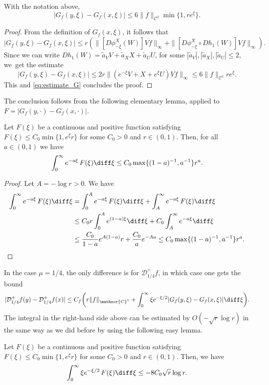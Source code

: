 \begin{lemma}
With the notation above,
\[
|G_{f}(y,\xi) -G_{f}(x,\xi) |\leq 6 \|f\|_{\mathscr{C}^2} \min\{1, r e^\xi\}.
\]
\end{lemma}
\begin{proof}
From the definition of $G_{f}(x,\xi)$, it follows that
\[
|G_{f}(y,\xi) -G_{f}(x,\xi) |\leq r (\|[D\phi^X_{-\xi}(W) ] Vf \|_\infty + \|[D\phi^X_{-\xi} \circ Dh_1 (W)] Vf \|_\infty).
\]
Since we can write $Dh_1 (W) = {\widetilde a_V}V+{\widetilde a_X}X+{\widetilde a_U}U$, for some $|{\widetilde a_V}|, |{\widetilde a_X}|, |{\widetilde a_U}|\leq 2$, we~get the estimate
\[
|G_{f}(y,\xi) -G_{f}(x,\xi) |\leq 2 r \|(e^{-\xi}V + X + e^{\xi}U)Vf\|_\infty \leq 6 \|f\|_{\mathscr{C}^2} r e^\xi.
\]
This and \eqref{eq:estimate_G} concludes the proof.
\end{proof}

The conclusion follows from the following elementary lemma, applied to $F=|G_{f}(y, \cdot) - G_{f}(x, \cdot)|$.

\begin{lemma}
Let $F(\xi)$ be a continuous and positive function satisfying $F(\xi) \leq C_0 \min\{ 1, e^\xi r\}$ for some $C_0>0$ and $r \in (0,1)$. Then, for all $a\in (0,1)$ we have
\[
\int_0^\infty e^{-a \xi} \, F(\xi) \diff \xi \leq C_0 \max\{(1-a)^{-1}, a^{-1}\} r^a.
\]
\end{lemma}
\begin{proof}
Let $A = -\log r >0$. We have
\begin{align*}
\int_0^\infty e^{-a \xi} \, F(\xi) \diff \xi &= \int_0^A e^{-a \xi} \, F(\xi) \diff \xi + \int_A^{\infty} e^{-a \xi} \, F(\xi) \diff \xi \\
& \leq C_0 r \int_0^A e^{(1-a) \xi} \diff \xi + C_0 \int_A^{\infty} e^{-a \xi} \diff \xi \\
&\leq \frac{C_0}{1-a}e^{A(1-a)} r + \frac{C_0}{a} e^{-Aa} \leq C_0 \max\{(1-a)^{-1}, a^{-1}\} r^a.\qedhere
\end{align*}
\end{proof}

In the case $\mu=1/4$, the only difference is for $\mathcal{D}^{+}_{1/4}f$, in which case one gets the bound
\[
|\mathcal{D}^{+}_{1/4}f(y) - \mathcal{D}^{+}_{1/4}f(x)|\leq C_{f} \biggl(r \|f\|_{\mathscr{C}^1} + \int_0^{\infty} \xi e^{- \xi/2} |G_{f}(y,\xi) -G_{f}(x,\xi) |\diff \xi \biggr).
\]
The integral in the right-hand side above can be estimated by $O(-\sqrt{r} \log r)$ in the same way as we did before by using the following easy lemma.
\begin{lemma}
Let $F(\xi)$ be a continuous and positive function satisfying $F(\xi) \leq C_0 \min\{ 1, e^\xi r\}$ for some $C_0>0$ and $r \in (0,1)$. Then, we have
\[
\int_0^\infty \xi e^{- \xi/2} \, F(\xi) \diff \xi \leq -8C_0 \sqrt{r} \log r.
\]
\end{lemma}

